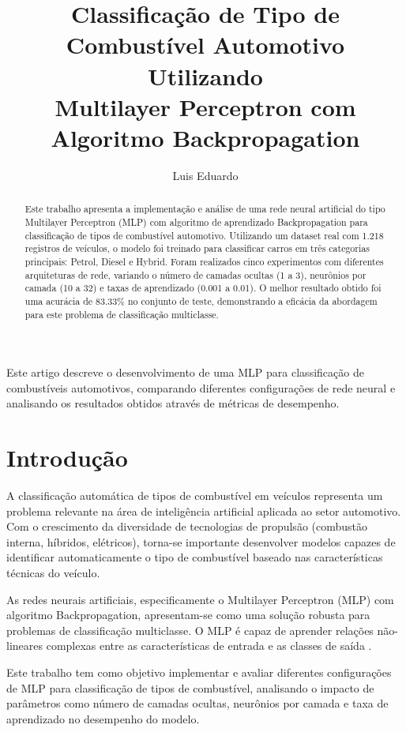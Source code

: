 \documentclass[12pt]{article}
\title{Classificação de Tipo de Combustível Automotivo Utilizando \\ Multilayer Perceptron com Algoritmo Backpropagation}
\author{Luis Eduardo\inst{1}}
\begin{document}
 

\maketitle

\begin{abstract}
Este trabalho apresenta a implementação e análise de uma rede neural artificial do tipo Multilayer Perceptron (MLP) com algoritmo de aprendizado Backpropagation para classificação de tipos de combustível automotivo. Utilizando um dataset real com 1.218 registros de veículos, o modelo foi treinado para classificar carros em três categorias principais: Petrol, Diesel e Hybrid. Foram realizados cinco experimentos com diferentes arquiteturas de rede, variando o número de camadas ocultas (1 a 3), neurônios por camada (10 a 32) e taxas de aprendizado (0.001 a 0.01). O melhor resultado obtido foi uma acurácia de 83.33\% no conjunto de teste, demonstrando a eficácia da abordagem para este problema de classificação multiclasse.
\end{abstract}
     
\begin{resumo} 
Este artigo descreve o desenvolvimento de uma MLP para classificação de combustíveis automotivos, comparando diferentes configurações de rede neural e analisando os resultados obtidos através de métricas de desempenho.
\end{resumo}

\section{Introdução}

A classificação automática de tipos de combustível em veículos representa um problema relevante na área de inteligência artificial aplicada ao setor automotivo. Com o crescimento da diversidade de tecnologias de propulsão (combustão interna, híbridos, elétricos), torna-se importante desenvolver modelos capazes de identificar automaticamente o tipo de combustível baseado nas características técnicas do veículo.

As redes neurais artificiais, especificamente o Multilayer Perceptron (MLP) com algoritmo Backpropagation, apresentam-se como uma solução robusta para problemas de classificação multiclasse. O MLP é capaz de aprender relações não-lineares complexas entre as características de entrada e as classes de saída \cite{haykin2009}.

Este trabalho tem como objetivo implementar e avaliar diferentes configurações de MLP para classificação de tipos de combustível, analisando o impacto de parâmetros como número de camadas ocultas, neurônios por camada e taxa de aprendizado no desempenho do modelo.
\end{document}
